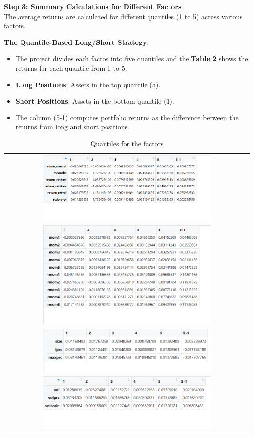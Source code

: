 \documentclass{article}
\begin{document}
\textbf{Step 3: Summary Calculations for Different Factors}\\
The average returns are calculated for different quantiles (1 to 5) across various factors.

\textbf{The Quantile-Based Long/Short Strategy:}
\begin{itemize}
    \item The project divides each factos into five quantiles and the {\bf Table 2} shows the returns for each quantile from 1 to 5.
    \item \textbf{Long Positions}: Assets in the top quantile (5).
    \item \textbf{Short Positions}: Assets in the bottom quantile (1).
    \item The column (5-1) computes portfolio returns as the difference between the returns from long and short positions.
\end{itemize}

\begin{table}[H]
    \centering
    \caption{Quantiles for the factors}
    \begin{tabular}{c}
        \includegraphics[width=0.7\textwidth]{21.png} \\
        \includegraphics[width=0.7\textwidth]{22.png} \\
        \includegraphics[width=0.7\textwidth]{23.png} \\
        \includegraphics[width=0.7\textwidth]{24.png} \\
    \end{tabular}
    \label{fig:example}
\end{table}
\end{document}

